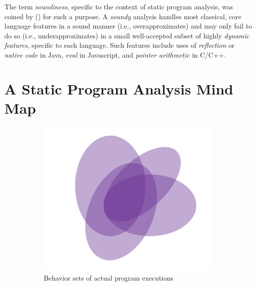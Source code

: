 The term \emph{soundiness}, specific to the context of static program analysis, was coined by (\todo{}) for such a purpose. A \emph{soundy} analysis handles most classical, core language features in a sound manner (i.e., overapproximates) and may only fail to do so (i.e., underapproximates) in a small well-accepted subset of highly \emph{dynamic features}, specific to each language. Such features include uses of \emph{reflection} or \emph{native code} in Java, \emph{eval} in Javascript, and \emph{pointer arithmetic} in C/C++.


\section{A Static Program Analysis Mind Map}

\begin{figure}[htb!]
\begin{subfigure}{.47\textwidth}
    \includegraphics[scale=.45]{assets/introduction/venn-soundness-a.pdf}
    \caption{Behavior sets of actual program executions}
    \label{fig:intro:soundness-a}
\end{subfigure}
\hfill
\begin{subfigure}{.47\textwidth}

\end{subfigure}
\end{figure}
